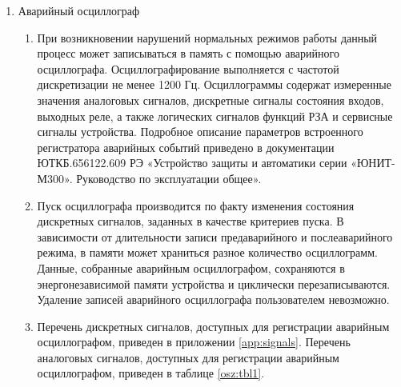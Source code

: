 \begin{enumerate}[label=\arabic{section}.\arabic{subsection}.\arabic*, labelsep=4pt, leftmargin=0pt, itemindent=57pt]
\begin{enumerate}[label=\arabic{section}.\arabic{subsection}.\arabic{enumi}.\arabic*, labelsep=4pt, leftmargin=0em, itemindent=65pt, parsep=0pt]
\end{enumerate}

\item Аварийный осциллограф
\begin{enumerate}[label=\arabic{section}.\arabic{subsection}.\arabic{enumi}.\arabic*, labelsep=4pt, leftmargin=0em, itemindent=65pt, parsep=0pt]
\item
При возникновении нарушений нормальных режимов работы данный процесс может записываться в память с помощью аварийного осциллографа. Осциллографирование выполняется с частотой дискретизации не менее 1200 Гц. Осциллограммы содержат измеренные значения аналоговых сигналов, дискретные сигналы состояния входов, выходных реле, а также логических сигналов функций РЗА и сервисные сигналы устройства. Подробное описание параметров встроенного регистратора аварийных событий приведено в документации ЮТКБ.656122.609 РЭ «Устройство защиты и автоматики серии «ЮНИТ-М300». Руководство по эксплуатации общее».
\item
Пуск осциллографа производится по факту изменения состояния дискретных сигналов, заданных в качестве критериев пуска. В зависимости от длительности записи предаварийного и послеаварийного режима, в памяти может храниться разное количество осциллограмм. Данные, собранные аварийным осциллографом, сохраняются в энергонезависимой памяти устройства и циклически перезаписываются. Удаление записей аварийного осциллографа пользователем невозможно.

\item
Перечень дискретных сигналов, доступных для регистрации аварийным осциллографом, приведен в приложении \ref{app:signals}. Перечень аналоговых сигналов, доступных для регистрации аварийным осциллографом, приведен в таблице \ref{osz:tbl1}.


\end{enumerate}
\end{enumerate}
